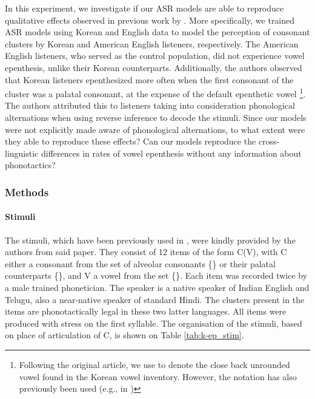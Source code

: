 {In this experiment, we investigate if our ASR models are able to reproduce qualitative effects observed in previous work by \cite{durvasula2015}. More specifically, we trained ASR models using Korean and English data to model the perception of consonant clusters by Korean and American English listeners, respectively. The American English listeners, who served as the control population, did not experience vowel epenthesis, unlike their Korean counterparts. Additionally, the authors observed that Korean listeners epenthesized  more often when the first consonant of the cluster was a palatal consonant, at the expense of the default epenthetic vowel \footnote{Following the original article, we use \textipa{[1]} to denote the close back unrounded vowel found in the Korean vowel inventory. However, the notation \textipa{[W]} has also previously been used (e.g., in \cite{kabak2007})}. The authors attributed this to listeners taking into consideration phonological alternations when using reverse inference to decode the stimuli. Since our models were not explicitly made aware of phonological alternations, to what extent were they able to reproduce these effects? Can our models reproduce the cross-linguistic differences in rates of vowel epenthesis without any information about phonotactics? 

\subsubsection{Methods}
\paragraph{Stimuli}

The stimuli, which have been previously used in \cite{durvasula2015}, were kindly provided by the authors from said paper. They consist of 12 items of the form C(V), with \textsc{C} either a consonant from the set of alveolar consonants \{\} or their palatal counterparts \{\}, and \textsc{V} a vowel from the set \{\}.
Each item was recorded twice by a male trained phonetician. The speaker is a native speaker of Indian English and Telugu, also a near-native speaker of standard Hindi. The clusters present in the items are phonotactically legal in these two latter languages. All items were produced with stress on the first syllable.
The organisation of the stimuli, based on place of articulation of \textsc{C}, is shown on Table \ref{tab:k-ep_stim}.

}
